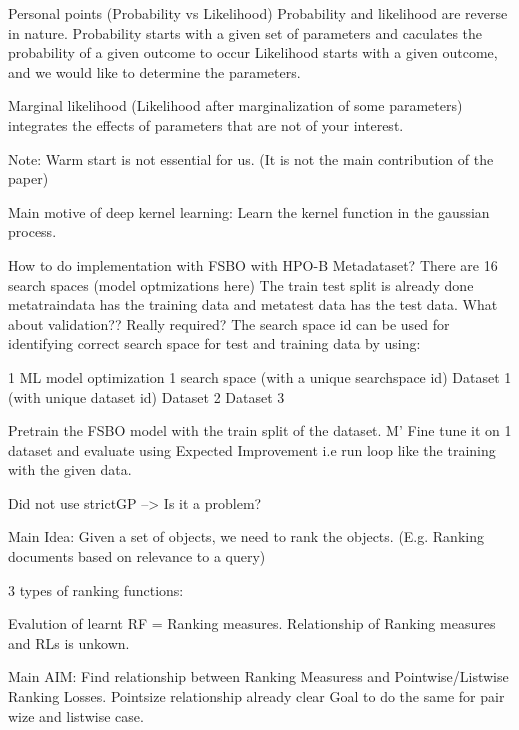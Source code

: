 \documentclass[12pt, twoside, ngerman]{report}
\begin{document}
Personal points (Probability vs Likelihood)
    Probability and likelihood are reverse in nature.
    Probability starts with a given set of parameters and caculates the probability of a given outcome to occur
    Likelihood starts with a given outcome, and we would like to determine the parameters.

    Marginal likelihood (Likelihood after marginalization of some parameters)
        integrates the effects of parameters that are not of your interest.

Note:
    Warm start is not essential for us. (It is not the main contribution of the paper)

Main motive of deep kernel learning:
    Learn the kernel function in the gaussian process.

How to do implementation with FSBO with HPO-B Metadataset?
There are 16 search spaces (model optmizations here)
    The train test split is already done metatraindata has the training data and metatest data has the test data.
    What about validation?? Really required?
    The search space id can be used for identifying correct search space for test and training data by using:

1 ML model optimization
    1 search space (with a unique searchspace id)
        Dataset 1 (with unique dataset id)
        Dataset 2
        Dataset 3

Pretrain the FSBO model with the train split of the dataset. M'
Fine tune it on 1 dataset and evaluate using Expected Improvement
    i.e run loop like the training with the given data.

Did not use strictGP --> Is it a problem?
\fi

\iffalse
Main Idea:
    Given a set of objects, we need to rank the objects. (E.g. Ranking documents based on relevance to a query)
    

3 types of ranking functions:


Evalution of learnt RF = Ranking measures.
Relationship of Ranking measures and RLs is unkown.


Main AIM:
    Find relationship between Ranking Measuress and Pointwise/Listwise Ranking Losses.
    Pointsize relationship already clear
    Goal to do the same for pair wize and listwise case.
\end{document}
